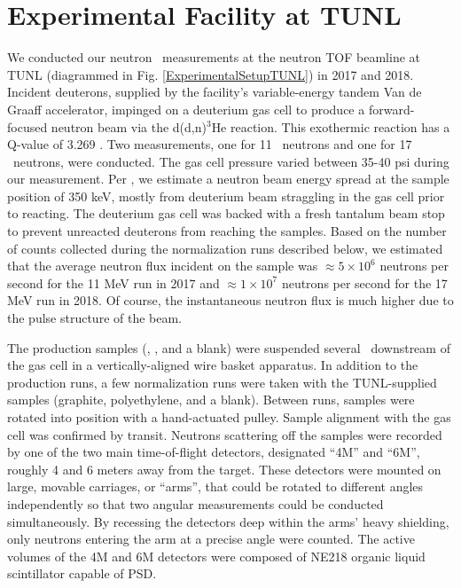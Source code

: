 \section{Experimental Facility at TUNL}
We conducted our neutron \el\ measurements at the neutron TOF
beamline at TUNL (diagrammed in Fig. \ref{ExperimentalSetupTUNL}) in 2017 and 2018.
Incident deuterons, supplied by the
facility's variable-energy tandem Van de Graaff accelerator, impinged on a deuterium
gas cell to produce a forward-focused neutron beam via the d(d,n)$^{3}$He
reaction. This exothermic reaction has a Q-value of 3.269 \mega\electronvolt.
Two measurements, one for 11 \mega\electronvolt\
neutrons and one for 17 \mega\electronvolt\ neutrons, were
conducted. The gas cell pressure varied between 35-40 psi during our
measurement. Per \cite{GussPhDThesis}, we estimate a neutron beam energy spread
at the sample position of 350 keV, mostly from deuterium beam straggling
in the gas cell prior to reacting. The deuterium gas cell
was backed with a fresh tantalum beam stop to prevent unreacted deuterons from
reaching the samples. Based on the number of counts collected during the
normalization runs described below, we estimated that the average neutron flux incident
on the sample was $\approx5\times10^{6}$ neutrons per second for the 11 MeV run
in 2017 and $\approx1\times10^{7}$ neutrons per second for the 17 MeV run in
2018. Of course, the instantaneous neutron flux is much higher due to the pulse
structure of the beam.

The production samples (\snTwelve, \snFour, and a blank) were suspended several
\centi\meter\ downstream of the gas cell in a vertically-aligned wire basket apparatus.
In addition to the production runs, a few normalization runs were taken
with the TUNL-supplied samples (graphite, polyethylene, and a blank).
Between runs, samples were rotated into position
with a hand-actuated pulley. Sample alignment with the gas cell was confirmed
by transit. Neutrons scattering off the samples were recorded by one
of the two main time-of-flight
detectors, designated ``4M'' and ``6M'', roughly 4 and 6 meters away from the target.
These detectors were mounted on large, movable carriages, or ``arms'',
that could be rotated to different angles independently so that two angular
measurements could be conducted simultaneously. By recessing the detectors deep within
the arms' heavy shielding, only neutrons entering the arm at a precise angle
were counted. The active volumes of the 4M and 6M detectors were composed of
NE218 organic liquid scintillator capable of PSD.


